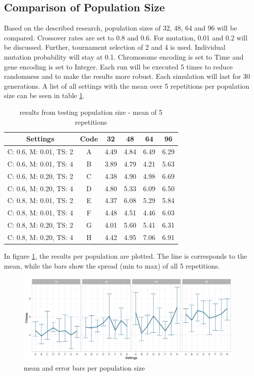 \subsection{Comparison of Population Size}
Based on the described research, population sizes of 32, 48, 64 and 96 will be compared. Crossover rates are set to 0.8 and 0.6. For mutation, 0.01 and 0.2 will be discussed. Further, tournament selection of 2 and 4 is used.
Individual mutation probability will stay at 0.1. Chromosome encoding is set to Time and gene encoding is set to Integer. 
Each run will be executed 5 times to reduce randomness and to make the results more robust. Each simulation will last for 30 generations. A list of all settings with the mean over 5 repetitions per population size can be seen in table \ref{tab:pop_settings_results}.

\begin{table}[h]
	\label{tab:pop_settings_results}
	\centering
\begin{tabular}{ c|c|cccc  }
	\hline
	Settings & Code & 32 & 48 & 64 & 96\\
	\hline
	C: 0.6, M: 0.01, TS: 2   	& A & 4.49 & 4.84 & 6.49 & 6.29 \\
	C: 0.6, M: 0.01, TS: 4		& B & 3.89 & 4.79 & 4.21 & 5.63 \\ 
	C: 0.6, M: 0.20, TS: 2 		& C & 4.38 & 4.90 & 4.98 & 6.69 \\
	C: 0.6, M: 0.20, TS: 4    	& D & 4.80 & 5.33 & 6.09 & 6.50 \\
	C: 0.8, M: 0.01, TS: 2   	& E & 4.37 & 6.08 & 5.29 & 5.84 \\
	C: 0.8, M: 0.01, TS: 4		& F & 4.48 & 4.51 & 4.46 & 6.03 \\
	C: 0.8, M: 0.20, TS: 2 		& G & 4.01 & 5.60 & 5.41 & 6.31 \\
	C: 0.8, M: 0.20, TS: 4    	& H & 4.42 & 4.95 & 7.06 & 6.91 \\
	\hline
\end{tabular}
\caption{results from testing population size - mean of 5 repetitions}
\end{table}

In figure \ref{figure:population:results}, the results per population are plotted. The line is corresponds to the mean, while the bars show the spread (min to max) of all 5 repetitions.
\begin{figure}[h] 
	\includegraphics[width=1\linewidth]{simulations/population/plots/comparison}
	\caption{mean and error bars per population size}
		\label{figure:population:results}
\end{figure}

